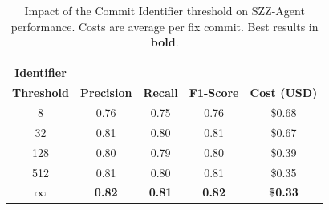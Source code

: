 \begin{table}[t]
\centering
\caption{Impact of the Commit Identifier threshold on SZZ-Agent performance. Costs are average per fix commit. Best results in \textbf{bold}.}
\label{tab:commit_identifier_threshold}
\begin{tabular}{c ccc c}
\toprule
\makecell{\textbf{Commit} \\ \textbf{Identifier} \\ \textbf{Threshold}} & \textbf{Precision} & \textbf{Recall} & \textbf{F1-Score} & \textbf{Cost (USD)} \\
\midrule
8 & 0.76 & 0.75 & 0.76 & \$0.68 \\
32 & 0.81 & 0.80 & 0.81 & \$0.67 \\
128 & 0.80 & 0.79 & 0.80 & \$0.39 \\
512 & 0.81 & 0.80 & 0.81 & \$0.35 \\
$\infty$ & \textbf{0.82} & \textbf{0.81} & \textbf{0.82} & \textbf{\$0.33} \\
\bottomrule
\end{tabular}
\end{table}
